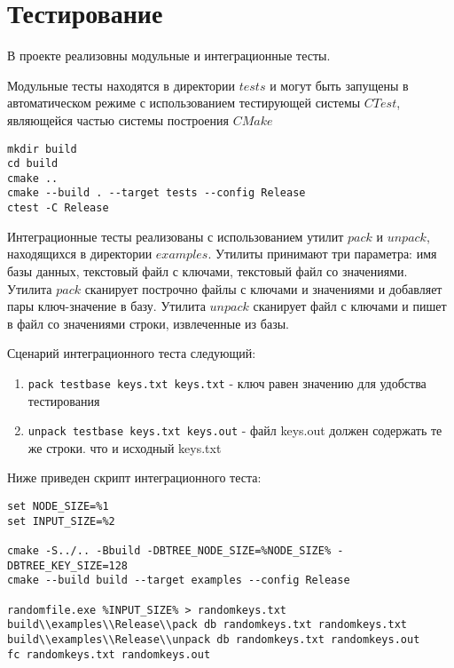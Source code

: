 \documentclass[14pt, russian]{scrartcl}
\begin{document}
\section{Тестирование}
В проекте реализовны модульные и интеграционные тесты. 

Модульные тесты находятся в директории $tests$ и могут быть запущены в автоматическом режиме с использованием тестирующей системы $CTest$, являющейся частью системы построения $CMake$ \cite{scottprofessionalcmake}

\begin{verbatim}
mkdir build
cd build
cmake ..
cmake --build . --target tests --config Release
ctest -C Release
\end{verbatim}

Интеграционные тесты реализованы с использованием утилит $pack$ и $unpack$, находящихся в директории $examples$. Утилиты принимают три параметра: имя базы данных, текстовый файл с ключами, текстовый файл со значениями. Утилита $pack$ сканирует построчно файлы с ключами и значениями и добавляет пары ключ-значение в базу. Утилита $unpack$ сканирует файл с ключами и пишет в файл со значениями строки, извлеченные из базы.

Сценарий интеграционного теста следующий:

\begin{enumerate}
    \item \texttt{pack testbase keys.txt keys.txt} - ключ равен значению для удобства тестирования
    \item \texttt{unpack testbase keys.txt keys.out}  - файл keys.out должен содержать те же строки. что и исходный keys.txt    
\end{enumerate}

Ниже приведен скрипт интеграционного теста:

\begin{verbatim}
set NODE_SIZE=%1
set INPUT_SIZE=%2

cmake -S../.. -Bbuild -DBTREE_NODE_SIZE=%NODE_SIZE% -DBTREE_KEY_SIZE=128
cmake --build build --target examples --config Release

randomfile.exe %INPUT_SIZE% > randomkeys.txt
build\\examples\\Release\\pack db randomkeys.txt randomkeys.txt
build\\examples\\Release\\unpack db randomkeys.txt randomkeys.out
fc randomkeys.txt randomkeys.out
\end{verbatim}
\end{document}
